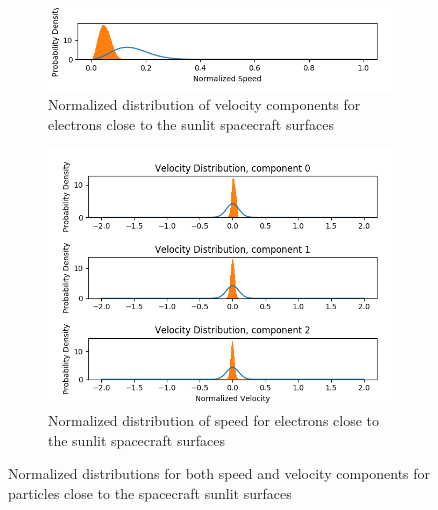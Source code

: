 \begin{figure}[H]
  \centering
  \begin{subfigure}[b]{0.75\textwidth}
  \includegraphics[width=\columnwidth]{figures/Appendix/AppendixB/PD/speedElectrons.png}
  \caption{Normalized distribution of velocity components for electrons close to the sunlit spacecraft surfaces}
  \label{fig:appB_PD_speed}
\end{subfigure}

\begin{subfigure}[b]{0.75\textwidth}
  \includegraphics[width=\columnwidth]{figures/Appendix/AppendixB/PD/vel.png}
  \caption{Normalized distribution of speed for electrons close to the sunlit spacecraft surfaces}
  \label{fig:appB_PD_vel}
\end{subfigure}
\caption{Normalized distributions for both speed and velocity components for particles close to the spacecraft sunlit surfaces}
\label{fig:appendixBPartialDomain}
\end{figure}
